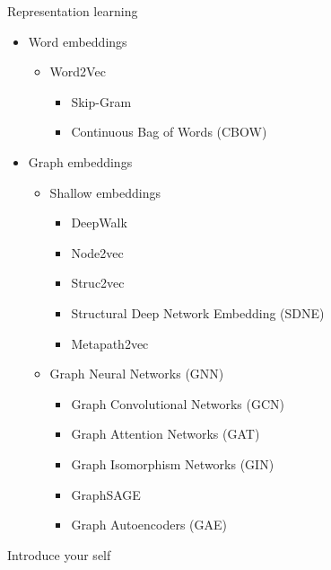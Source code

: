 \documentclass[aspectratio=169]{beamer}
\begin{document}
        \begin{frame}{Representation learning}
            \begin{itemize}
                \item Word embeddings
                \begin{itemize}
                    \item Word2Vec
                    \begin{itemize}
                        \item Skip-Gram
                        \item Continuous Bag of Words (CBOW)
                    \end{itemize}
                \end{itemize}
                \item Graph embeddings
                \begin{itemize}
                    \item Shallow embeddings
                    \begin{itemize}
                        \item DeepWalk
                        \item Node2vec
                        \item Struc2vec
                        \item Structural Deep Network Embedding (SDNE)
                        \item Metapath2vec
                    \end{itemize}
                    \item Graph Neural Networks (GNN)
                    \begin{itemize}
                        \item Graph Convolutional Networks (GCN)
                        \item Graph Attention Networks (GAT)
                        \item Graph Isomorphism Networks (GIN)
                        \item GraphSAGE
                        \item Graph Autoencoders (GAE)
                    \end{itemize}
                \end{itemize}
            \end{itemize}

            \begin{note}
                {Introduce your self}
            \end{note}
        \end{frame}
\end{document}
